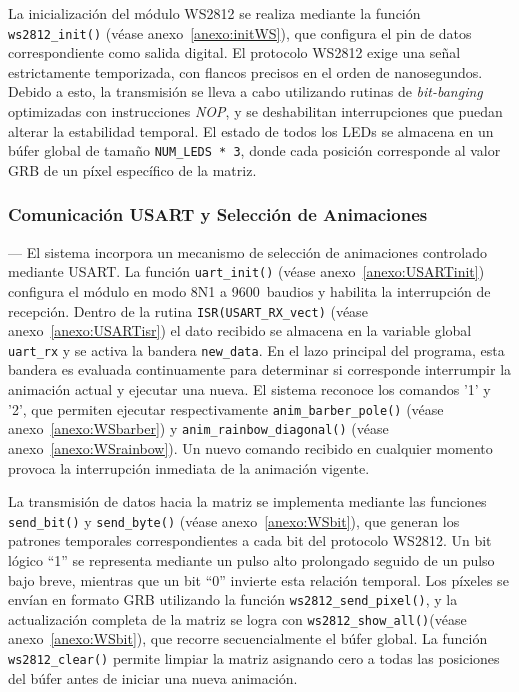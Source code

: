 \vspace{1em}

La inicialización del módulo WS2812 se realiza mediante la función \texttt{ws2812\_init()} (véase anexo~\ref{anexo:initWS}), que configura el pin de datos correspondiente como salida digital. El protocolo WS2812 exige una señal estrictamente temporizada, con flancos precisos en el orden de nanosegundos. Debido a esto, la transmisión se lleva a cabo utilizando rutinas de \textit{bit-banging} optimizadas con instrucciones \textit{NOP}, y se deshabilitan interrupciones que puedan alterar la estabilidad temporal. El estado de todos los LEDs se almacena en un búfer global de tamaño \texttt{NUM\_LEDS * 3}, donde cada posición corresponde al valor GRB de un píxel específico de la matriz.

\vspace{1em}

\subsubsection{Comunicación USART y Selección de Animaciones} ---
El sistema incorpora un mecanismo de selección de animaciones controlado mediante USART. La función \texttt{uart\_init()} (véase anexo~\ref{anexo:USARTinit}) configura el módulo en modo 8N1 a 9600~baudios y habilita la interrupción de recepción. Dentro de la rutina \texttt{ISR(USART\_RX\_vect)} (véase anexo~\ref{anexo:USARTisr}) el dato recibido se almacena en la variable global \texttt{uart\_rx} y se activa la bandera \texttt{new\_data}. En el lazo principal del programa, esta bandera es evaluada continuamente para determinar si corresponde interrumpir la animación actual y ejecutar una nueva. El sistema reconoce los comandos '1' y '2', que permiten ejecutar respectivamente \texttt{anim\_barber\_pole()} (véase anexo~\ref{anexo:WSbarber}) y \texttt{anim\_rainbow\_diagonal()} (véase anexo~\ref{anexo:WSrainbow}). Un nuevo comando recibido en cualquier momento provoca la interrupción inmediata de la animación vigente.

\vspace{1em}

La transmisión de datos hacia la matriz se implementa mediante las funciones \texttt{send\_bit()} y \texttt{send\_byte()} (véase anexo~\ref{anexo:WSbit}), que generan los patrones temporales correspondientes a cada bit del protocolo WS2812. Un bit lógico “1” se representa mediante un pulso alto prolongado seguido de un pulso bajo breve, mientras que un bit “0” invierte esta relación temporal. Los píxeles se envían en formato GRB utilizando la función \texttt{ws2812\_send\_pixel()}, y la actualización completa de la matriz se logra con \texttt{ws2812\_show\_all()}(véase anexo~\ref{anexo:WSbit}), que recorre secuencialmente el búfer global. La función \texttt{ws2812\_clear()} permite limpiar la matriz asignando cero a todas las posiciones del búfer antes de iniciar una nueva animación.

